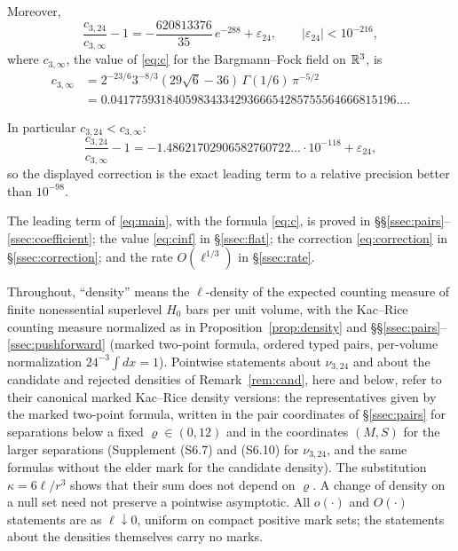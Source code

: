 \begin{theorem}
Moreover,
\begin{equation}\tag{2.10}\label{eq:correction}
\frac{c_{3,24}}{c_{3,\infty}}-1=-\frac{620813376}{35}\,e^{-288}+\varepsilon_{24},\qquad |\varepsilon_{24}|<10^{-216},
\end{equation}
where $c_{3,\infty}$, the value of \eqref{eq:c} for the Bargmann--Fock field on $\mathbb R^3$, is
\begin{equation}\tag{2.11}\label{eq:cinf}
\begin{aligned}
c_{3,\infty}&=2^{-23/6}3^{-8/3}(29\sqrt6-36)\,\Gamma(1/6)\,\pi^{-5/2}\\
&=0.0417759318405983433429366654285755564666815196\ldots .
\end{aligned}
\end{equation}
\end{theorem}

In particular $c_{3,24}<c_{3,\infty}$:
\[
\frac{c_{3,24}}{c_{3,\infty}}-1=-1.48621702906582760722\ldots\cdot10^{-118}+\varepsilon_{24},
\]
so the displayed correction is the exact leading term to a relative precision better than $10^{-98}$.

The leading term of \eqref{eq:main}, with the formula \eqref{eq:c}, is proved in \S\S\ref{ssec:pairs}--\ref{ssec:coefficient}; the value \eqref{eq:cinf} in \S\ref{ssec:flat}; the correction \eqref{eq:correction} in \S\ref{ssec:correction}; and the rate $O(\ell^{1/3})$ in \S\ref{ssec:rate}.

\begin{convention}[density]\label{conv:density}
Throughout, ``density'' means the $\ell$-density of the expected counting measure of finite nonessential superlevel $H_0$ bars per unit volume, with the Kac--Rice counting measure normalized as in Proposition~\ref{prop:density} and \S\S\ref{ssec:pairs}--\ref{ssec:pushforward} (marked two-point formula, ordered typed pairs, per-volume normalization $24^{-3}\int dx=1$). Pointwise statements about $\nu_{3,24}$ and about the candidate and rejected densities of Remark~\ref{rem:cand}, here and below, refer to their canonical marked Kac--Rice density versions: the representatives given by the marked two-point formula, written in the pair coordinates of \S\ref{ssec:pairs} for separations below a fixed $\varrho\in(0,12)$ and in the coordinates $(M,S)$ for the larger separations (Supplement (S6.7) and (S6.10) for $\nu_{3,24}$, and the same formulas without the elder mark for the candidate density). The substitution $\kappa=6\ell/r^3$ shows that their sum does not depend on $\varrho$. A change of density on a null set need not preserve a pointwise asymptotic. All $o(\cdot)$ and $O(\cdot)$ statements are as $\ell\downarrow0$, uniform on compact positive mark sets; the statements about the densities themselves carry no marks.
\end{convention}


